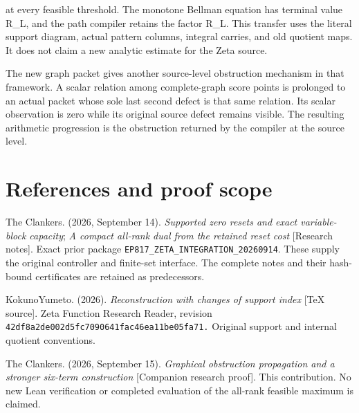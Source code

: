 at every feasible threshold. The monotone Bellman equation has terminal value R\_L, and the path compiler retains the factor R\_L. This transfer uses the literal support diagram, actual pattern columns, integral carries, and old quotient maps. It does not claim a new analytic estimate for the Zeta source.

The new graph packet gives another source-level obstruction mechanism in that framework. A scalar relation among complete-graph score points is prolonged to an actual packet whose sole last second defect is that same relation. Its scalar observation is zero while its original source defect remains visible. The resulting arithmetic progression is the obstruction returned by the compiler at the source level.

\section{References and proof scope}\label{n09-references-and-proof-scope}

The Clankers. (2026, September 14). \emph{Supported zero resets and exact variable-block capacity}; \emph{A compact all-rank dual from the retained reset cost} {[}Research notes{]}. Exact prior package \nolinkurl{EP817_ZETA_INTEGRATION_20260914}. These supply the original controller and finite-set interface. The complete notes and their hash-bound certificates are retained as predecessors.

KokunoYumeto. (2026). \emph{Reconstruction with changes of support index} {[}TeX source{]}. Zeta Function Research Reader, revision \nolinkurl{42df8a2de002d5fc7090641fac46ea11be05fa71.} Original support and internal quotient conventions.

The Clankers. (2026, September 15). \emph{Graphical obstruction propagation and a stronger six-term construction} {[}Companion research proof{]}. This contribution. No new Lean verification or completed evaluation of the all-rank feasible maximum is claimed.
